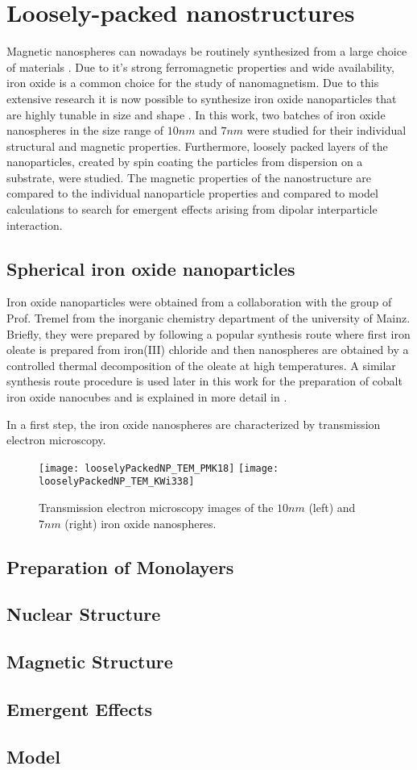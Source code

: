 \documentclass[\main/dresen_thesis.tex]{subfiles}
\begin{document}
\chapter{Loosely-packed nanostructures}\label{ch:looselyPackedNS}
Magnetic nanospheres can nowadays be routinely synthesized from a large choice of materials \cite{Gubin_2005_Magne}.
Due to it's strong ferromagnetic properties and wide availability, iron oxide is a common choice for the study of nanomagnetism.
Due to this extensive research it is now possible to synthesize iron oxide nanoparticles that are highly tunable in size and shape \cite{Wetterskog_2014_Preci}.
In this work, two batches of iron oxide nanospheres in the size range of $10 \unit{nm}$ and $7 \unit{nm}$ were studied for their individual structural and magnetic properties.
Furthermore, loosely packed layers of the nanoparticles, created by spin coating the particles from dispersion on a substrate, were studied.
The magnetic properties of the nanostructure are compared to the individual nanoparticle properties and compared to model calculations to search for emergent effects arising from dipolar interparticle interaction.

\section{Spherical iron oxide nanoparticles}
Iron oxide nanoparticles were obtained from a collaboration with the group of Prof. Tremel from the inorganic chemistry department of the university of Mainz.
Briefly, they were prepared by following a popular synthesis route where first iron oleate is prepared from iron(III) chloride and then nanospheres are obtained by a controlled thermal decomposition of the oleate at high temperatures.
A similar synthesis route procedure is used later in this work for the preparation of cobalt iron oxide nanocubes and is explained in more detail in .

In a first step, the iron oxide nanospheres are characterized by transmission electron microscopy.
\begin{figure}[tb]
  \centering
  \texttt{[image: looselyPackedNP\_TEM\_PMK18]}
  \texttt{[image: looselyPackedNP\_TEM\_KWi338]}
  \caption{\label{fig:looselyPackedNP:nanoparticle:tem}Transmission electron microscopy images of the $10 \unit{nm}$ (left) and $7 \unit{nm}$ (right) iron oxide nanospheres.}
\end{figure}

\section{Preparation of Monolayers}

\section{Nuclear Structure}

\section{Magnetic Structure}

\section{Emergent Effects}

\section{Model}
\end{document}
